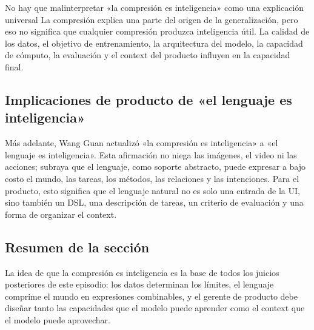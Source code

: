 \begin{warningbox}{No hay que malinterpretar «la compresión es inteligencia» como una explicación universal}
La compresión explica una parte del origen de la generalización, pero eso no significa que cualquier compresión produzca inteligencia útil. La calidad de los datos, el objetivo de entrenamiento, la arquitectura del modelo, la capacidad de cómputo, la evaluación y el context del producto influyen en la capacidad final.
\end{warningbox}

\subsection{Implicaciones de producto de «el lenguaje es inteligencia»}

Más adelante, Wang Guan actualizó «la compresión es inteligencia» a «el lenguaje es inteligencia». Esta afirmación no niega las imágenes, el video ni las acciones; subraya que el lenguaje, como soporte abstracto, puede expresar a bajo costo el mundo, las tareas, los métodos, las relaciones y las intenciones. Para el producto, esto significa que el lenguaje natural no es solo una entrada de la UI, sino también un DSL, una descripción de tareas, un criterio de evaluación y una forma de organizar el context.

\subsection{Resumen de la sección}

La idea de que la compresión es inteligencia es la base de todos los juicios posteriores de este episodio: los datos determinan los límites, el lenguaje comprime el mundo en expresiones combinables, y el gerente de producto debe diseñar tanto las capacidades que el modelo puede aprender como el context que el modelo puede aprovechar.

